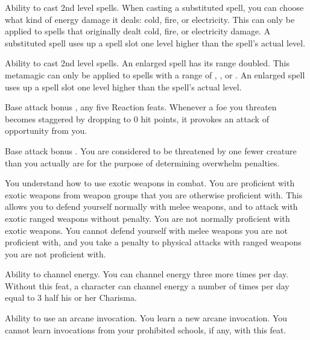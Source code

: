  Ability to cast 2nd level spells.
 When casting a substituted spell, you can choose what kind of energy damage it deals: cold, fire, or electricity. This can only be applied to spells that originally dealt cold, fire, or electricity damage. A substituted spell uses up a spell slot one level higher than the spell's actual level.

 Ability to cast 2nd level spells.
 An enlarged spell has its range doubled. This metamagic can only be applied to spells with a range of \rngclose, \rngmed, or \rnglong. An enlarged spell uses up a spell slot one level higher than the spell's actual level.

 Base attack bonus , any five Reaction feats.
 Whenever a foe you threaten becomes staggered by dropping to 0 hit points, it provokes an attack of opportunity from you.

 Base attack bonus .
 You are considered to be threatened by one fewer creature than you actually are for the purpose of determining overwhelm penalties.

You understand how to use exotic weapons in combat.
 You are proficient with exotic weapons from weapon groups that you are otherwise proficient with. This allows you to defend yourself normally with melee weapons, and to attack with exotic ranged weapons without penalty.
 You are not normally proficient with exotic weapons. You cannot defend yourself with melee weapons you are not proficient with, and you take a  penalty to physical attacks with ranged weapons you are not proficient with.

 Ability to channel energy.
 You can channel energy three more times per day.
 Without this feat, a character can channel energy a number of times per day equal to 3 \add half his or her Charisma.

 Ability to use an arcane invocation.
 You learn a new arcane invocation. You cannot learn invocations from your prohibited schools, if any, with this feat.

